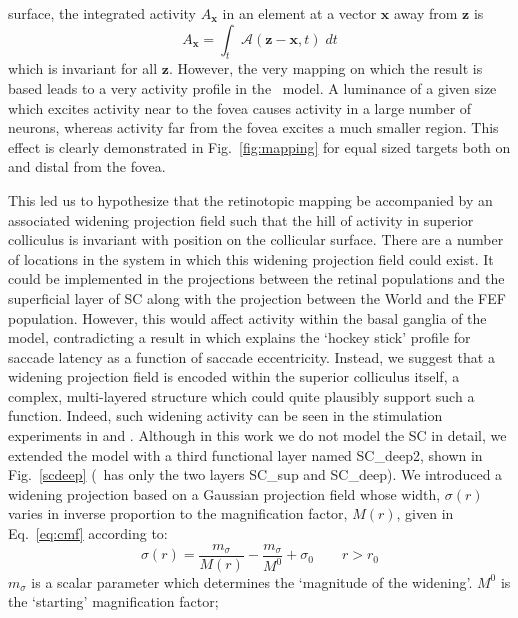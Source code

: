 surface, the integrated activity  $A_{\mathbf{x}}$ in an element at a
vector $\mathbf{x}$ away from $\mathbf{z}$ is
\begin{equation}
A_{\mathbf{x}} = \int_t \mathcal{A}(\mathbf{z}-\mathbf{x}, t)\;dt
\end{equation}
which is invariant for all $\mathbf{z}$. However, the very mapping on
which the \cite{tabareau_geometry_2007} result is based leads to a
very  activity profile in the \ccg~model. A luminance of
a given size which excites activity near to the fovea causes activity
in a large number of neurons, whereas activity far from the fovea
excites a much smaller region. This effect is clearly demonstrated in
Fig.~\ref{fig:mapping} for equal sized targets both on and distal from
the fovea.

This led us to hypothesize that the retinotopic mapping be accompanied
by an associated widening projection field such that the hill of
activity in superior colliculus is invariant with position on the
collicular surface. There are a number of locations in the system in
which this widening projection field could exist. It could be
implemented in the projections between the retinal populations and the
superficial layer of SC along with the projection between the World
and the FEF population. However, this would affect activity within the
basal ganglia of the model, contradicting a result
in \cite{cope_basal_2017} which explains the `hockey stick' profile
for saccade latency as a function of saccade eccentricity. Instead, we
suggest that a widening projection field is encoded within the
superior colliculus itself, a complex, multi-layered structure which
could quite plausibly support such a function. Indeed, such widening
activity can be seen in the stimulation experiments
in \cite{vokoun_intralaminar_2010}
and \cite{vokoun_response_2014}. Although in this work we do not model
the SC in detail, we extended the model with a third functional layer named SC\_deep2, shown in Fig.~\ref{scdeep}
(\ccg~has only the two layers SC\_sup and SC\_deep). We
introduced a widening projection based on a Gaussian projection field
whose width, $\sigma(r)$ varies in inverse proportion to the
magnification factor, $M(r)$, given in Eq.~\ref{eq:cmf} according to:
\begin{equation} \label{eq:sigmar}
\sigma(r) = \frac{m_{\sigma}}{M(r)} - \frac{m_{\sigma}}{M^0} + \sigma_0 \qquad r > r_0
\end{equation}
$m_{\sigma}$ is a scalar parameter which determines the `magnitude
of the widening'. $M^0$ is the `starting' magnification factor;
